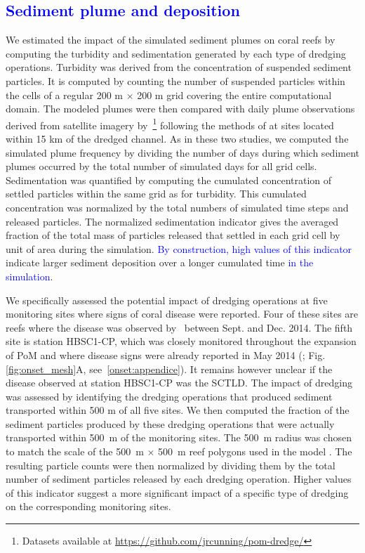 \documentclass[preprint,12pt,authoryear]{elsarticle}
\newcommand{\modif}[1]{\textcolor{blue}{#1}}
\begin{document}
\modif{\subsection{Sediment plume and deposition}}

We estimated the impact of the simulated sediment plumes on coral reefs by computing the turbidity and sedimentation generated by each type of dredging operations. Turbidity was derived from the concentration of suspended sediment particles. It is computed by counting the number of suspended particles within the cells of a regular 200 m $\times$ 200 m grid covering the entire computational domain. The modeled plumes were then compared with daily plume observations derived from satellite imagery by~\cite{cunning2019extensive}\footnote{Datasets available at \url{https://github.com/jrcunning/pom-dredge/}} following the methods of \cite{barnes2015sediment} at sites located within 15 km of the dredged channel. As in these two studies, we computed the simulated plume frequency by dividing the number of days during which sediment plumes occurred by the total number of simulated days for all grid cells. Sedimentation was quantified by computing the cumulated concentration of settled particles within the same grid as for turbidity. This cumulated concentration was normalized by the total numbers of simulated time steps and released particles. The normalized sedimentation indicator gives the averaged fraction of the total mass of particles released that settled in each grid cell by unit of area during the simulation. \modif{By construction, high values of this indicator} indicate larger sediment deposition over a longer cumulated time \modif{in the simulation}.

We specifically assessed the potential impact of dredging operations at five monitoring sites where signs of coral disease were reported. Four of these sites are reefs where the disease was observed by~\cite{precht2016unprecedented} between Sept. and Dec. 2014. The fifth site is station HBSC1-CP, which was closely monitored throughout the expansion of PoM and where disease signs were already reported in May 2014 (\citealp{dial2017}; Fig. \ref{fig:onset_mesh}A, see~\ref{onset:appendice}). It remains however unclear if the disease observed at station HBSC1-CP was the SCTLD. The impact of dredging was assessed by identifying the dredging operations that produced sediment transported within 500 m of all five sites. We then computed the fraction of the sediment particles produced by these dredging operations that were actually transported within 500~m of the monitoring sites. The 500~m radius was chosen to match the scale of the 500~m $\times$ 500~m reef polygons used in the model \citep{dobbelaere2020coupled}. The resulting particle counts were then normalized by dividing them by the total number of sediment particles released by each dredging operation. Higher values of this indicator suggest a more significant impact of a specific type of dredging on the corresponding monitoring sites.
\end{document}
